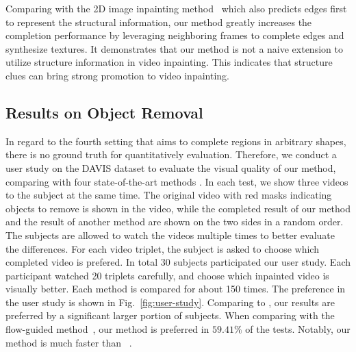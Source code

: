 Comparing with the 2D image inpainting method~\cite{nazeri2019edgeconnect} which also predicts edges first to represent 
the structural information, our method greatly increases the completion performance by leveraging neighboring frames to complete edges and synthesize textures. 
%
It demonstrates that our method is not a naive extension to utilize structure information in video inpainting.
This indicates that structure clues can bring strong promotion to video inpainting.


 

%


\subsection{Results on Object Removal}


In regard to the fourth setting that aims to complete regions in arbitrary shapes, there is no ground truth for quantitatively evaluation. Therefore,
we conduct a user study on the DAVIS dataset to evaluate the visual quality of our method, comparing with four state-of-the-art methods \cite{nazeri2019edgeconnect,wang2019video,Kim_2019_CVPR1,Xu_2019_CVPR}.
%
In each test, we show three videos to the subject at the same time. The original video with red masks indicating objects to remove is shown in the video, while the completed result of our method and the result of another method are shown on the two sides in a random order.
%  
The subjects are allowed to watch the videos multiple times to better evaluate the differences.
For each video triplet, the subject is asked to choose which completed video is prefered.
%
In total 30 subjects participated our user study. 
Each participant watched 20 triplets carefully, and choose which inpainted video is visually better. 
%
Each method is compared for about 150 times.
%
The preference in the user study is shown in Fig.~\ref{fig:user-study}. 
%
Comparing to \cite{nazeri2019edgeconnect,wang2019video,Kim_2019_CVPR1}, our results are preferred by a significant larger portion of subjects.
%
When comparing with the flow-guided method~\cite{Xu_2019_CVPR}, our method is preferred in $59.41\%$ of the tests. 
Notably, our method is much faster than ~\cite{Xu_2019_CVPR}.

